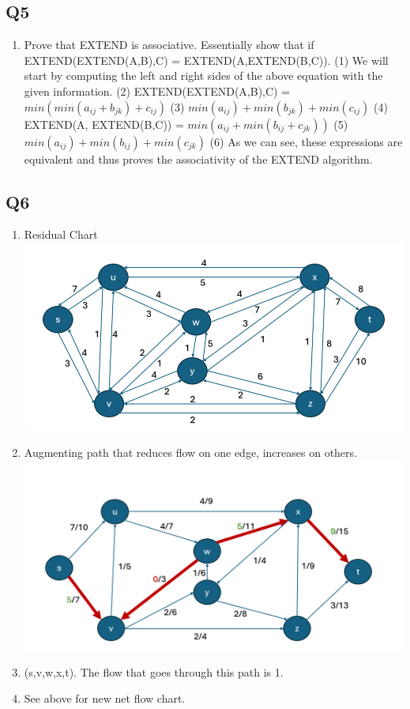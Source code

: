\documentclass{article}
\begin{document}
\subsection*{Q5}
\begin{enumerate}[label=(\alph*)]
    \item Prove that EXTEND is associative. Essentially show that if EXTEND(EXTEND(A,B),C) = EXTEND(A,EXTEND(B,C)).
    \subitem (1) We will start by computing the left and right sides of the above equation with the given information.
    \subitem (2) EXTEND(EXTEND(A,B),C) = $min(min(a_{ij}+b_{jk}) + c_{ij})$
    \subitem (3) $min(a_{ij}) + min(b_{jk}) + min(c_{ij})$
    \subitem (4) EXTEND(A, EXTEND(B,C)) = $min(a_{ij}+ min(b_{ij} + c_{jk}))$
    \subitem (5) $min(a_{ij}) + min(b_{ij}) + min(c_{jk})$
    \subitem (6) As we can see, these expressions are equivalent and thus proves the associativity of the EXTEND algorithm.
 \end{enumerate}

\subsection*{Q6}
\begin{enumerate}[label=(\alph*)]
    \item Residual Chart
    \subitem \includegraphics[width=.75\textwidth]{problem6residual.png}
    \item Augmenting path that reduces flow on one edge, increases on others.
    \subitem \includegraphics[width=.75\textwidth]{problem6b.png}
    \item (s,v,w,x,t). The flow that goes through this path is 1.
    \item See above for new net flow chart.
\end{enumerate}
\end{document}
